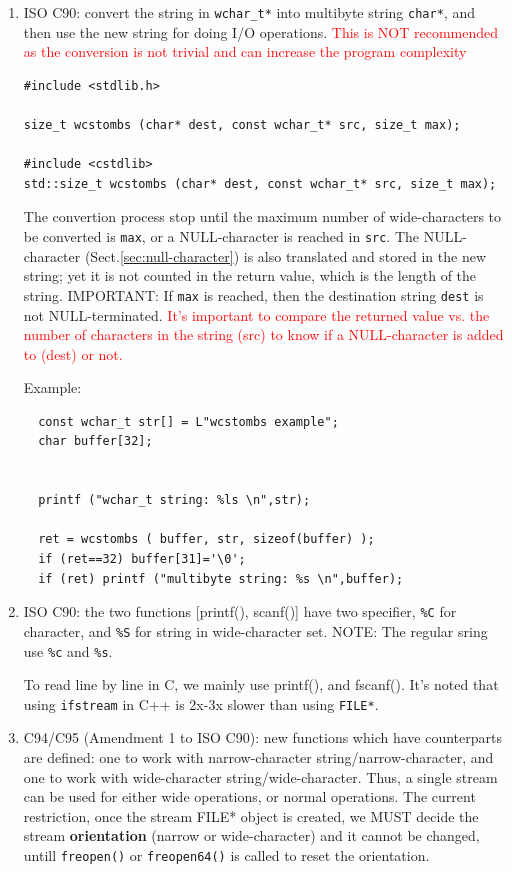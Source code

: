 \begin{enumerate}
  \item ISO C90: convert the string in \verb!wchar_t*! into multibyte
  string \verb!char*!, and then use the new string for doing I/O operations.
  \textcolor{red}{This is NOT recommended as the conversion is not trivial and
  can increase the program complexity}

\begin{verbatim}
#include <stdlib.h>

size_t wcstombs (char* dest, const wchar_t* src, size_t max);

#include <cstdlib>
std::size_t wcstombs (char* dest, const wchar_t* src, size_t max);
\end{verbatim}

The convertion process stop until the maximum number of wide-characters to be
converted is \verb!max!, or a NULL-character is reached in \verb!src!. The
NULL-character (Sect.\ref{sec:null-character}) is also translated and stored in
the new string; yet it is not counted in the return value, which is the length
of the string. IMPORTANT: If \verb!max! is reached, then the destination string
\verb!dest! is not NULL-terminated. \textcolor{red}{It's important to compare
the returned value vs. the number of characters in the string (src) to know if
a NULL-character is added to (dest) or not.}

Example:
\begin{Verbatim}
  const wchar_t str[] = L"wcstombs example";
  char buffer[32];


  printf ("wchar_t string: %ls \n",str);

  ret = wcstombs ( buffer, str, sizeof(buffer) );
  if (ret==32) buffer[31]='\0';
  if (ret) printf ("multibyte string: %s \n",buffer);

\end{Verbatim}

   \item ISO C90: the two functions [printf(), scanf()] have two specifier,
   \verb!%C! for character, and \verb!%S! for string in wide-character set.
    NOTE: The regular sring use \verb!%c! and \verb!%s!.
   
   To read line by line in C, we mainly use printf(), and fscanf(). It's noted that
using \verb!ifstream! in C++ is 2x-3x slower than using \verb!FILE*!. 

   \item C94/C95 (Amendment 1 to ISO C90): new functions which have counterparts
   are defined: one to work with narrow-character string/narrow-character, and
   one to work with wide-character string/wide-character. Thus, a single stream
   can be used for either wide operations, or normal operations. The current
   restriction, once the stream FILE* object is created, we MUST decide the
   stream {\bf orientation} (narrow or wide-character) and it cannot be changed,
   untill \verb!freopen()! or \verb!freopen64()! is called to reset the
   orientation.
   

\end{enumerate}
